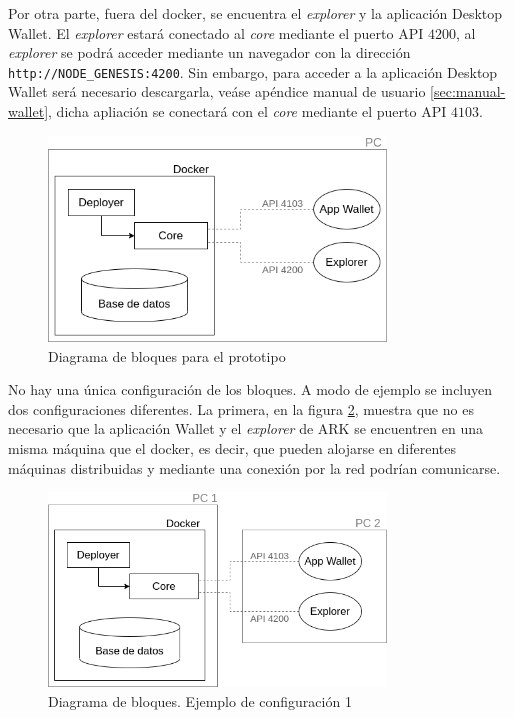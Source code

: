 Por otra parte, fuera del docker, se encuentra el \textit{explorer} y la aplicación Desktop Wallet. El \textit{explorer} estará conectado al \textit{core} mediante el puerto API $4200$, al \textit{explorer} se podrá acceder mediante un navegador con la dirección \mbox{\texttt{http://NODE\_GENESIS:4200}}. Sin embargo, para acceder a la aplicación Desktop Wallet será necesario descargarla, veáse apéndice manual de usuario \ref{sec:manual-wallet}, dicha apliación se conectará con el \textit{core} mediante el puerto API $4103$.\\


\begin{figure}[H]
	\centering
	\includegraphics[width=0.8\textwidth]{figuras/diagrama_bloquesARK.png}
	\caption{Diagrama de bloques para el prototipo}
	\label{fig:diag-bloques-1}
\end{figure}

No hay una única configuración de los bloques. A modo de ejemplo se incluyen dos configuraciones diferentes. La primera, en la figura \ref{fig:diag-bloques-2}, muestra que no es necesario que la aplicación Wallet y el \textit{explorer} de ARK se encuentren en una misma máquina que el docker, es decir, que pueden alojarse en diferentes máquinas distribuidas y mediante una conexión por la red podrían comunicarse.\\ 

\begin{figure}[H]
	\centering
	\includegraphics[width=0.8\textwidth]{figuras/diagrama_bloquesARK2.png}
	\caption{Diagrama de bloques. Ejemplo de configuración 1}
	\label{fig:diag-bloques-2}
\end{figure}


